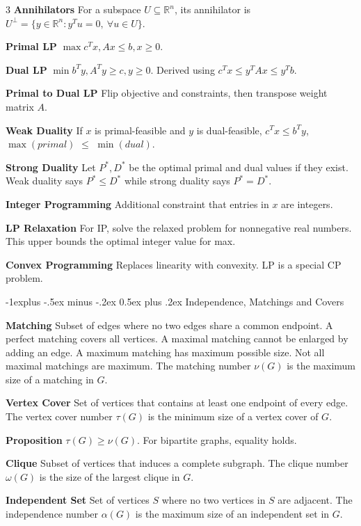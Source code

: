 \documentclass[10pt, landscape]{article}
\makeatletter
\renewcommand{\section}{\@startsection{section}{1}{0mm}%
                                {-1ex plus -.5ex minus -.2ex}%
                                {0.5ex plus .2ex}%
                                {\normalfont\large\bfseries}}
\renewcommand{\section}{\@startsection{section}{2}{0mm}%
                                {-1explus -.5ex minus -.2ex}%
                                {0.5ex plus .2ex}%
                                {\normalfont\normalsize\bfseries}}
\makeatother
\begin{document}
\begin{multicols*}{3}
\textbf{Annihilators} For a subspace $U \subseteq \mathbb{R}^n$, its annihilator is $U^\perp=\{y \in \mathbb{R}^n:y^Tu=0,\  \forall u \in U\}$.

\textbf{Primal LP} $\max c^Tx, Ax \leq b, x \geq 0$.

\textbf{Dual LP} $\min b^Ty, A^Ty \geq c, y \geq 0$. Derived using $c^Tx \leq y^TAx \leq y^Tb$.

\textbf{Primal to Dual LP} Flip objective and constraints, then transpose weight matrix $A$.

\textbf{Weak Duality} If $x$ is primal-feasible and $y$ is dual-feasible, $c^Tx \leq b^Ty$, $\max(primal)$ $\leq$ $\min(dual)$.

\textbf{Strong Duality} Let $P^*, D^*$ be the optimal primal and dual values if they exist. Weak duality says $P^* \leq D^*$ while strong duality says $P^*=D^*$.

\textbf{Integer Programming} Additional constraint that entries in $x$ are integers.

\textbf{LP Relaxation} For IP, solve the relaxed problem for nonnegative real numbers. This upper bounds the optimal integer value for max.

\textbf{Convex Programming} Replaces linearity with convexity. LP is a special CP problem.

\section{Independence, Matchings and Covers}

\textbf{Matching} Subset of edges where no two edges share a common endpoint. A perfect matching covers all vertices. A maximal matching cannot be enlarged by adding an edge. A maximum matching has maximum possible size. Not all maximal matchings are maximum. The matching number $\nu(G)$ is the maximum size of a matching in $G$.

\textbf{Vertex Cover} Set of vertices that contains at least one endpoint of every edge. The vertex cover number $\tau(G)$ is the minimum size of a vertex cover of $G$.

\textbf{Proposition} $\tau(G) \geq \nu(G)$. For bipartite graphs, equality holds.

\textbf{Clique} Subset of vertices that induces a complete subgraph. The clique number $\omega(G)$ is the size of the largest clique in $G$.

\textbf{Independent Set} Set of vertices $S$ where no two vertices in $S$ are adjacent. The independence number $\alpha(G)$ is the maximum size of an independent set in $G$.


\end{multicols*}
\end{document}

